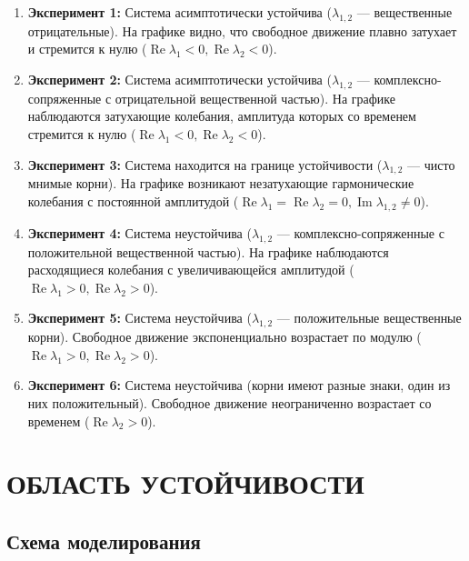 \documentclass[14pt,a4paper]{extarticle}
\begin{document}
\begin{enumerate}
    \item \textbf{Эксперимент 1:} Система асимптотически устойчива ($\lambda_{1,2}$ — вещественные отрицательные). На графике видно, что свободное движение плавно затухает и стремится к нулю ($\operatorname{Re}\lambda_1 < 0, \operatorname{Re}\lambda_2 < 0$).
    
    \item \textbf{Эксперимент 2:} Система асимптотически устойчива ($\lambda_{1,2}$ — комплексно-сопряженные с отрицательной вещественной частью). На графике наблюдаются затухающие колебания, амплитуда которых со временем стремится к нулю ($\operatorname{Re}\lambda_1 < 0, \operatorname{Re}\lambda_2 < 0$).
    
    \item \textbf{Эксперимент 3:} Система находится на границе устойчивости ($\lambda_{1,2}$ — чисто мнимые корни). На графике возникают незатухающие гармонические колебания с постоянной амплитудой ($\operatorname{Re}\lambda_1 = \operatorname{Re}\lambda_2 = 0, \operatorname{Im}\lambda_{1,2} \neq 0$).
    
    \item \textbf{Эксперимент 4:} Система неустойчива ($\lambda_{1,2}$ — комплексно-сопряженные с положительной вещественной частью). На графике наблюдаются расходящиеся колебания с увеличивающейся амплитудой ($\operatorname{Re}\lambda_1 > 0, \operatorname{Re}\lambda_2 > 0$).
    
    \item \textbf{Эксперимент 5:} Система неустойчива ($\lambda_{1,2}$ — положительные вещественные корни). Свободное движение экспоненциально возрастает по модулю ($\operatorname{Re}\lambda_1 > 0, \operatorname{Re}\lambda_2 > 0$).
    
    \item \textbf{Эксперимент 6:} Система неустойчива (корни имеют разные знаки, один из них положительный). Свободное движение неограниченно возрастает со временем ($\operatorname{Re}\lambda_2 > 0$).
\end{enumerate}


\newpage
\section{ОБЛАСТЬ УСТОЙЧИВОСТИ}

\subsection{Схема моделирования}
\end{document}
